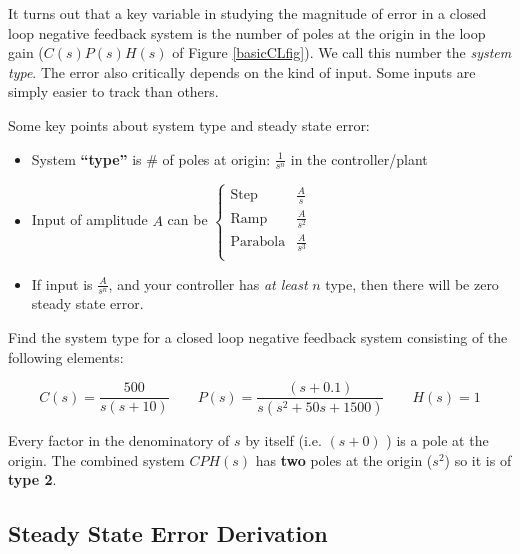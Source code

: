 It turns out that a key variable in studying the magnitude of error in a closed loop negative feedback system
is the number of poles at the origin in the loop gain ($C(s)P(s)H(s)$ of Figure \ref{basicCLfig}). We
call this number the {\it system type}.  The error also critically depends on the kind of input.  Some
inputs are simply easier to track than  others.

\noindent
Some key points about system type and steady state error:
 \begin{itemize}
 	\item System {\bf ``type''} is \# of poles at origin: $\frac{1}{s^n}$ in the controller/plant

 	\item Input of amplitude $A$ can be
 	$
 	\left \{
  	\begin{array}{lc}
 	\mathrm{Step}		&    \frac{A}{s}   \\
 	\mathrm{Ramp}		&    \frac{A}{s^2}  \\
 	\mathrm{Parabola}	&    \frac{A}{s^3}  \\
 	\end{array}
 	\right .
        $

 	\item  If input is $\frac{A}{s^n}$, and your controller has {\it at least} $n$ type,
 		then there will be zero steady state error.
 \end{itemize}


\begin{ExampleSmall}
Find the system type for a closed loop negative feedback system consisting of the following elements:


 \[
 C(s) = \frac{500}{s(s+10)} \qquad P(s) = \frac{(s+0.1)}{s(s^2+50s+1500)} \qquad H(s) = 1
 \]

 \vspace{0.25in}
Every factor in the denominatory of $s$ by itself (i.e. $(s+0)$ ) is a pole at the origin.
The combined system $CPH(s)$ has {\bf two} poles at the origin ($s^2$) so it is of {\bf type 2}.
\end{ExampleSmall}








\subsection{Steady State Error Derivation}

